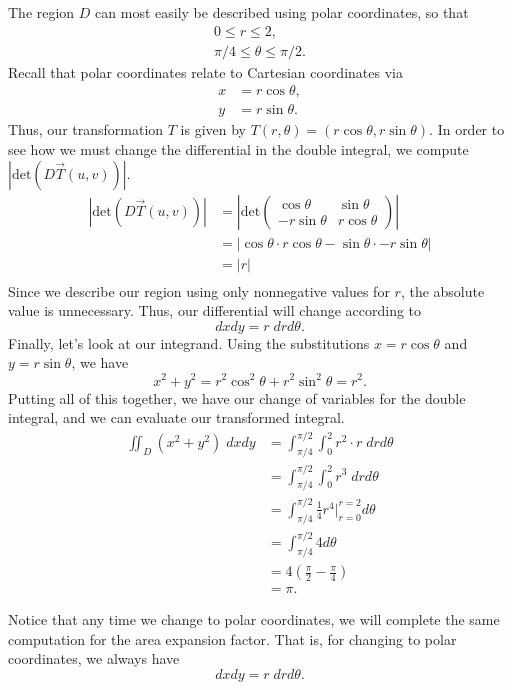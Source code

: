 \documentclass{ximera}
\begin{document}
The region $D$ can most easily be described using polar coordinates, so that
\begin{align*}
0\leq r\leq 2,\\
\pi/4\leq \theta\leq \pi/2.
\end{align*}
Recall that polar coordinates relate to Cartesian coordinates via
\begin{align*}
x &= r\cos\theta,\\
y &= r\sin\theta.
\end{align*}
Thus, our transformation $T$ is given by $T(r,\theta) = (r\cos\theta, r\sin\theta)$. In order to see how we must change the differential in the double integral, we compute $\left|\text{det}(D\vec{T}(u,v))\right|$.
\begin{align*}
\left|\text{det}(D\vec{T}(u,v))\right| &= \left|\text{det}\begin{pmatrix}\cos\theta & \sin\theta \\ -r\sin\theta & r\cos\theta\end{pmatrix}\right|\\
&= \left|\cos\theta\cdot r\cos\theta - \sin\theta \cdot -r\sin\theta \right|\\
&= \left|r\right|\\
\end{align*}
Since we describe our region using only nonnegative values for $r$, the absolute value is unnecessary. Thus, our differential will change according to
\[
dxdy = r\;drd\theta.
\]
Finally, let's look at our integrand. Using the substitutions $x = r\cos\theta$ and $y = r\sin\theta$, we have
\[
x^2 +y^2 = r^2\cos^2\theta + r^2\sin^2\theta = r^2.
\]
Putting all of this together, we have our change of variables for the double integral, and we can evaluate our transformed integral.
\begin{align*}
\iint_D (x^2+y^2)\;dxdy &= \int_{\pi/4}^{\pi/2}\int_0^2 r^2\cdot r\;drd\theta\\
&= \int_{\pi/4}^{\pi/2}\int_0^2 r^3\;drd\theta\\
&= \int_{\pi/4}^{\pi/2}\frac{1}{4}r^4|_{r = 0}^{r = 2}d\theta\\
&= \int_{\pi/4}^{\pi/2}4d\theta\\
&= 4\left(\frac{\pi}{2}-\frac{\pi}{4}\right)\\
&= \pi.
\end{align*}

Notice that any time we change to polar coordinates, we will complete the same computation for the area expansion factor. That is, for changing to polar coordinates, we always have
\[
dxdy = r\;drd\theta.
\]
\end{document}
